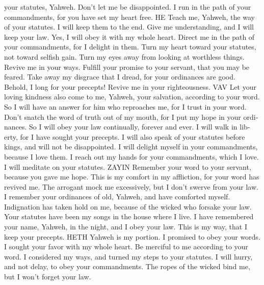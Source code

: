 \begin{paracol}{2}
\begin{otherlanguage}{english}
your statutes, Yahweh. Don't let me be disappointed.  I
run in the path of your commandments, for you have set my heart free. HE
 Teach me, Yahweh, the way of your statutes. I will keep
them to the end.  Give me understanding, and I will keep
your law. Yes, I will obey it with my whole heart. 
Direct me in the path of your commandments, for I delight in them.
 Turn my heart toward your statutes, not toward selfish
gain.  Turn my eyes away from looking at worthless
things. Revive me in your ways.  Fulfill your promise to
your servant, that you may be feared.  Take away my
disgrace that I dread, for your ordinances are good. 
Behold, I long for your precepts! Revive me in your righteousness. VAV
 Let your loving kindness also come to me, Yahweh, your
salvation, according to your word.  So I will have an
answer for him who reproaches me, for I trust in your word.
 Don't snatch the word of truth out of my mouth, for I
put my hope in your ordinances.  So I will obey your law
continually, forever and ever.  I will walk in liberty,
for I have sought your precepts.  I will also speak of
your statutes before kings, and will not be disappointed.
 I will delight myself in your commandments, because I
love them.  I reach out my hands for your commandments,
which I love. I will meditate on your statutes. ZAYIN 
Remember your word to your servant, because you gave me hope.
 This is my comfort in my affliction, for your word has
revived me.  The arrogant mock me excessively, but I
don't swerve from your law.  I remember your ordinances
of old, Yahweh, and have comforted myself.  Indignation
has taken hold on me, because of the wicked who forsake your law.
 Your statutes have been my songs in the house where I
live.  I have remembered your name, Yahweh, in the night,
and I obey your law.  This is my way, that I keep your
precepts. HETH  Yahweh is my portion. I promised to obey
your words.  I sought your favor with my whole heart. Be
merciful to me according to your word.  I considered my
ways, and turned my steps to your statutes.  I will
hurry, and not delay, to obey your commandments.  The
ropes of the wicked bind me, but I won't forget your law.

\end{otherlanguage}
\end{paracol}
